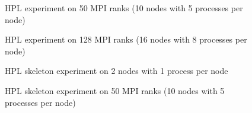 \begin{figure}[!ht]
    \centering
    \caption{HPL experiment on 50 MPI ranks (10 nodes with 5 processes per node)}
    \label{fig:5_high_level:hpl_vanilla_10x5}
\end{figure}

\begin{figure}[!ht]
    \centering
    \caption{HPL experiment on 128 MPI ranks (16 nodes with 8 processes per node)}
    \label{fig:5_high_level:hpl_vanilla_16x8}
\end{figure}


\begin{figure}[!th]
    \centering
    \caption{HPL skeleton experiment on 2 nodes with 1 process per node}
    \label{fig:5_high_level:hpl_optimized_2x1_grid5000}
\end{figure}

\begin{figure}[!th]
    \centering
    \caption{HPL skeleton experiment on 50 MPI ranks (10 nodes with 5 processes per node)}
    \label{fig:5_high_level:hpl_optimized_10x5_grid5000}
\end{figure}

